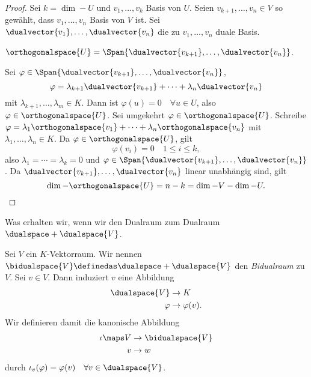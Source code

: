 \begin{proof}
  Sei \( k=\dim-{U} \) und \( v_1,\dotsc,v_k \) Basis von \( U \). Seien \( v_{k+1},\dotsc, v_n\in V \) so gewählt, dass \( v_1,\dotsc, v_n \) Basis von \( V  \) ist. Sei \( \dualvector{v_1},\dotsc, \dualvector{v_n} \) die zu \( v_1,\dotsc,v_n \) duale Basis.
  \begin{behauptung}
    \( \orthogonalspace{U}=\Span{\dualvector{v_{k+1}},\dotsc,\dualvector{v_n}} \).
  \end{behauptung}
  Sei \( \varphi\in \Span{\dualvector{v_{k+1}},\dotsc,\dualvector{v_n}} \), \dh
  \begin{equation*}
    \varphi=\lambda_{k+1}\dualvector{v_{k+1}}+\dotsb+\lambda_n \dualvector{v_n}
  \end{equation*}
  mit \( \lambda_{k+1},\dotsc, \lambda_m\in K \). Dann ist \( \varphi(u)=0 \quad \forall u\in U\), also \( \varphi\in \orthogonalspace{U} \). Sei umgekehrt \( \varphi\in \orthogonalspace{U} \). Schreibe \( \varphi=\lambda_1 \orthogonalspace{v_1}+\dotsb+\lambda_n \orthogonalspace{v_n} \) mit \( \lambda_1,\dotsc,\lambda_n\in K \). Da \( \varphi\in \orthogonalspace{U} \), gilt
  \begin{equation*}
    \varphi(v_i)=0\quad 1\leq i\leq k,
  \end{equation*}
  also \( \lambda_1=\dotsb=\lambda_k=0 \) und \( \varphi\in \Span{\dualvector{v_{k+1}},\dotsc,\dualvector{v_n}} \). Da \( \dualvector{v_{k+1}},\dotsc,\dualvector{v_n} \) linear unabhängig sind, gilt
  \begin{equation*}
    \dim-{\orthogonalspace{U}}=n-k=\dim-{V}-\dim-{U}.
  \end{equation*}
\end{proof}
\begin{frage*}
  Was erhalten wir, wenn wir den Dualraum zum Dualraum \( \dualspace+{\dualspace{V}} \).
\end{frage*}
\begin{definition*}
  Sei \( V \) ein \( K \)-Vektorraum. Wir nennen \( \bidualspace{V}\definedas \dualspace+{\dualspace{V}} \) den \emph{Bidualraum} zu \( V \). Sei \( v\in V \). Dann induziert \( v \) eine Abbildung
  \begin{equation*}
    \begin{split}
      \dualspace{V}&\to K\\
      \varphi&\to \varphi(v).
    \end{split}
  \end{equation*}
  Wir definieren damit die kanonische Abbildung
  \begin{equation*}
    \begin{split}
      \iota\maps V&\to \bidualspace{V}\\
      v&\to w
    \end{split}
  \end{equation*}
  durch \( \iota_v(\varphi)=\varphi(v)\quad \forall v\in\dualspace{V} \).
\end{definition*}

